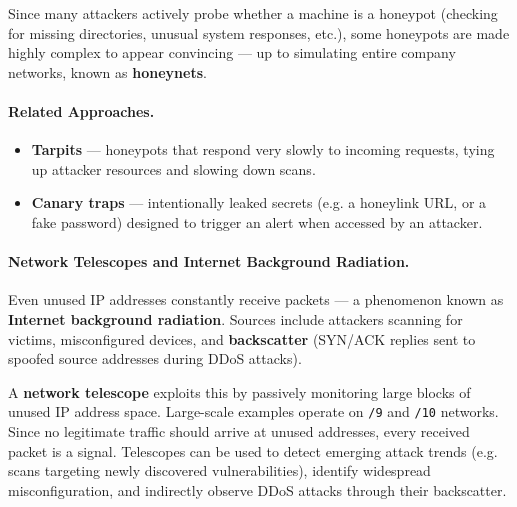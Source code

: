 Since many attackers actively probe whether a machine is a honeypot (checking for missing directories, unusual system responses, etc.), some honeypots are made highly complex to appear convincing — up to simulating entire company networks, known as \textbf{honeynets}.

\paragraph{Related Approaches.}
\begin{itemize}
    \item \textbf{Tarpits} — honeypots that respond very slowly to incoming requests, tying up attacker resources and slowing down scans.
    \item \textbf{Canary traps} — intentionally leaked secrets (e.g. a honeylink URL, or a fake password) designed to trigger an alert when accessed by an attacker.
\end{itemize}

\paragraph{Network Telescopes and Internet Background Radiation.}
Even unused IP addresses constantly receive packets — a phenomenon known as \textbf{Internet background radiation}. Sources include attackers scanning for victims, misconfigured devices, and \textbf{backscatter} (SYN/ACK replies sent to spoofed source addresses during DDoS attacks). 

A \textbf{network telescope} exploits this by passively monitoring large blocks of unused IP address space. Large-scale examples operate on \texttt{/9} and \texttt{/10} networks. Since no legitimate traffic should arrive at unused addresses, every received packet is a signal. Telescopes can be used to detect emerging attack trends (e.g. scans targeting newly discovered vulnerabilities), identify widespread misconfiguration, and indirectly observe DDoS attacks through their backscatter.
